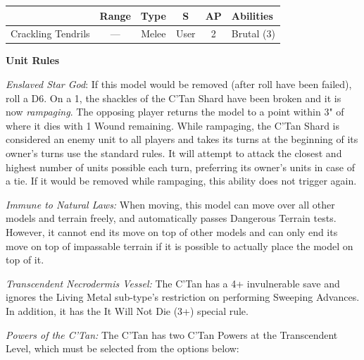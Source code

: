 \begin{minipage}[t]{0.72\textwidth}
	\begin{tabular}{m{95 pt} *{4}{c} >{\raggedright\arraybackslash}p{130pt}}
		& Range & Type & S & AP & Abilities \\
		\hline
		Crackling Tendrils & — & Melee & User & 2 & Brutal (3)  \\
	\end{tabular}
	
	
	\vspace*{2em}
	\textbf{Unit Rules}
		
	\textit{Enslaved Star God}: If this model would be removed (after  roll have been failed), roll a D6. On a 1, the shackles of the C'Tan Shard have been broken and it is now \textit{rampaging}. The opposing player returns the model to a point within 3" of where it dies with 1 Wound remaining. While rampaging, the C'Tan Shard is considered an enemy unit to all players and takes its turns at the beginning of its owner's turns use the standard rules. It will attempt to attack the closest and highest number of units possible each turn, preferring its owner's units in case of a tie. If it would be removed while rampaging, this ability does not trigger again.
	
	\textit{Immune to Natural Laws:} When moving, this model can move over all other models and terrain freely, and automatically passes Dangerous Terrain tests. However, it cannot end its move on top of other models and can only end its move on top of impassable terrain if it is possible to actually place the model on top of it.
	
	\textit{Transcendent Necrodermis Vessel:} The C'Tan has a 4+ invulnerable save and ignores the Living Metal sub-type's restriction on performing Sweeping Advances. In addition, it has the It Will Not Die (3+) special rule.
	
	\textit{Powers of the C'Tan:} The C'Tan has two C'Tan Powers at the Transcendent Level, which must be selected from the options below:
	

\end{minipage}
